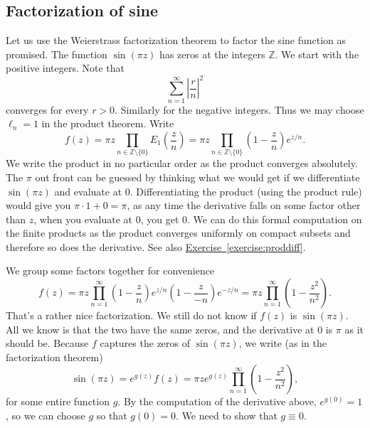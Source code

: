 \documentclass[12pt,openany]{book}
\newcommand{\abs}[1]{\left\lvert {#1} \right\rvert}
\newcommand{\Z}{{\mathbb{Z}}}
\theoremstyle{plain}
\theoremstyle{remark}
\theoremstyle{definition}
\theoremstyle{exercise}
\theoremstyle{example}
\newcommand{\exerciseref}[1]{\hyperref[#1]{Exercise~\ref*{#1}}}
\begin{document}
\subsection{Factorization of sine}

Let us use the Weierstrass factorization theorem to factor the sine function
as promised.  The function $\sin(\pi z)$ has zeros at the integers $\Z$.
We start with the positive integers.  Note that
\begin{equation*}
\sum_{n=1}^\infty \abs{\frac{r}{n}}^{2}
\end{equation*}
converges for every $r > 0$.  Similarly for the negative integers.  Thus we
may choose $\ell_n =1$ in the product theorem.  Write
\begin{equation*}
f(z) =
\pi z \prod_{n \in \Z \setminus \{ 0 \}} E_1\left(\frac{z}{n}\right)
= 
\pi z \prod_{n \in \Z \setminus \{ 0 \}} \left(1-\frac{z}{n}\right) e^{z/n} .
\end{equation*}
We write the product in no particular order as the product converges
absolutely.
The $\pi$ out front can be guessed by thinking what we would get if we
differentiate $\sin(\pi z)$ and evaluate at $0$.
Differentiating the product (using the product rule) would give you $\pi \cdot 1
+ 0=\pi$, as any time the derivative falls on some factor other than $z$, when
you evaluate at $0$, you get $0$.  We can do this formal computation on the
finite products as the product converges uniformly on compact subsets and
therefore so does the derivative.  See also \exerciseref{exercise:proddiff}.

We group some factors together for convenience
\begin{equation*}
f(z) =
\pi z \prod_{n=1}^\infty 
\left(1-\frac{z}{n}\right) e^{z/n}
\left(1-\frac{z}{-n}\right) e^{-z/n}
=
\pi z \prod_{n=1}^\infty 
\left(1-\frac{z^2}{n^2}\right) .
\end{equation*}
That's a rather nice factorization.  We still do not know if $f(z)$ is
$\sin(\pi z)$.
All we know is that the two have the same zeros,
and the derivative at $0$ is $\pi$ as it should be.
Because $f$ captures the zeros of $\sin(\pi z)$, we write
(as in the factorization theorem)
\begin{equation*}
\sin(\pi z)
= 
e^{g(z)} f(z)
=
\pi z
e^{g(z)}
\prod_{n=1}^\infty 
\left(1-\frac{z^2}{n^2}\right) ,
\end{equation*}
for some entire function $g$.
By the
computation of the derivative above,
$e^{g(0)}=1$, so we can choose $g$ so that $g(0) = 0$.
We need to show that $g \equiv 0$.
\end{document}
